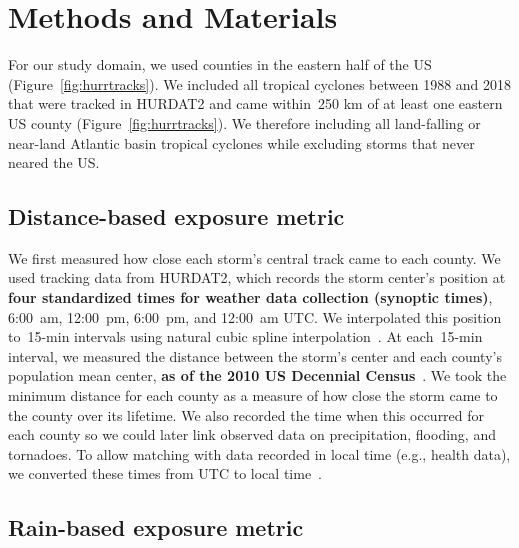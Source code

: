 \section*{Methods and Materials}

For our study domain, we used counties in the eastern half of the \ac{US}
(Figure~\ref{fig:hurrtracks}).  We included all tropical cyclones between 1988
and 2018 that were tracked in \ac{HURDAT2} \parencite{landsea2013} and came
within~250 \si{\kilo\metre} of at least one eastern \ac{US} county
(Figure~\ref{fig:hurrtracks}). We therefore including all land-falling or
near-land Atlantic basin tropical cyclones while excluding storms that never
neared the \ac{US}.  

\subsection*{Distance-based exposure metric}

We first measured how close each storm's central track came to each county. We
used tracking data from \ac{HURDAT2}, which records the storm center's position
at \textbf{four standardized times for weather data collection (synoptic
times)}, 6:00~am, 12:00~pm, 6:00~pm, and 12:00~am \ac{UTC}.  We interpolated
this position to~15-\si{\minute} intervals using natural cubic spline
interpolation~\parencite{hurricaneexposure}. At each~15-\si{\minute} interval,
we measured the distance between the storm's center and each county's
population mean center, \textbf{as of the 2010 US Decennial
Census}~\parencite{countycenters}. We took the minimum distance for each county
as a measure of how close the storm came to the county over its lifetime.  We
also recorded the time when this occurred for each county so we could later
link observed data on precipitation, flooding, and tornadoes.  To allow
matching with data recorded in local time (e.g., health data), we converted
these times from \ac{UTC} to local time~\parencite{countytimezones}.

\subsection*{Rain-based exposure metric}

